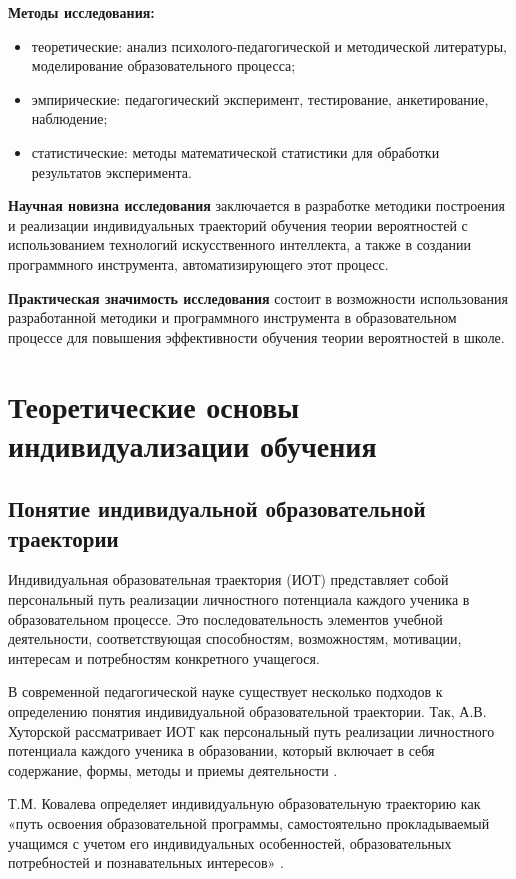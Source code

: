 \documentclass[a4paper,14pt]{extreport}
\begin{document}
\textbf{Методы исследования:}
\begin{itemize}
    \item теоретические: анализ психолого-педагогической и методической литературы, моделирование образовательного процесса;
    \item эмпирические: педагогический эксперимент, тестирование, анкетирование, наблюдение;
    \item статистические: методы математической статистики для обработки результатов эксперимента.
\end{itemize}

\textbf{Научная новизна исследования} заключается в разработке методики построения и реализации индивидуальных траекторий обучения теории вероятностей с использованием технологий искусственного интеллекта, а также в создании программного инструмента, автоматизирующего этот процесс.

\textbf{Практическая значимость исследования} состоит в возможности использования разработанной методики и программного инструмента в образовательном процессе для повышения эффективности обучения теории вероятностей в школе.

\chapter{Теоретические основы индивидуализации обучения}

\section{Понятие индивидуальной образовательной траектории}

Индивидуальная образовательная траектория (ИОТ) представляет собой персональный путь реализации личностного потенциала каждого ученика в образовательном процессе. Это последовательность элементов учебной деятельности, соответствующая способностям, возможностям, мотивации, интересам и потребностям конкретного учащегося.

В современной педагогической науке существует несколько подходов к определению понятия индивидуальной образовательной траектории. Так, А.В. Хуторской рассматривает ИОТ как персональный путь реализации личностного потенциала каждого ученика в образовании, который включает в себя содержание, формы, методы и приемы деятельности \cite{khutorskoy}.

Т.М. Ковалева определяет индивидуальную образовательную траекторию как «путь освоения образовательной программы, самостоятельно прокладываемый учащимся с учетом его индивидуальных особенностей, образовательных потребностей и познавательных интересов» \cite{kovaleva}.
\end{document}
